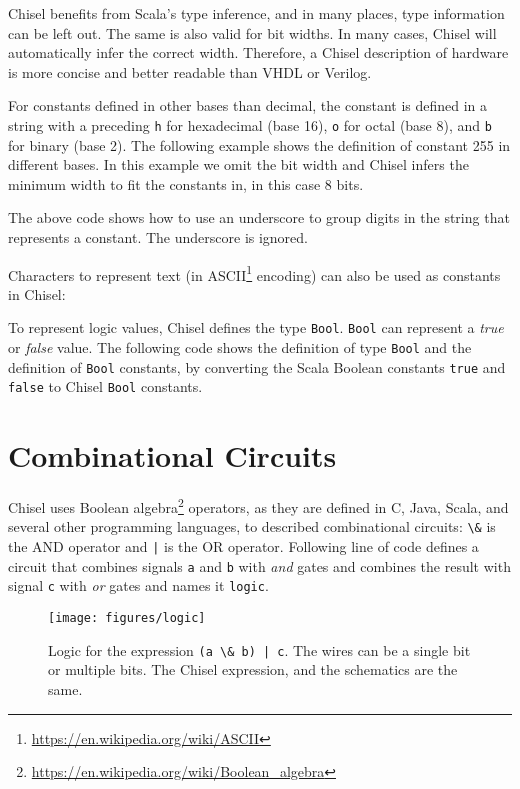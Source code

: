 \documentclass[%
    10pt,
    headinclude, footexclude,
    openright, %
    notitlepage,
    cleardoubleempty,
    headsepline,
    pointlessnumbers,
    bibtotoc, idxtotoc,
    ]{scrbook}
\newcommand{\scale}{0.7}
\newcommand{\code}[1]{{\lstinline[basicstyle=\small\ttfamily]{#1}}}
\newcommand{\myref}[2]{\href{#1}{#2}}
\renewcommand{\myref}[2]{{#2}{\footnote{\url{#1}}}}
\begin{document}
Chisel benefits from Scala's type inference, and in many places, type information can be left out.
The same is also valid for bit widths. In many cases, Chisel will automatically infer the correct width.
Therefore, a Chisel description of hardware is more concise and better readable than VHDL or
Verilog.

For constants defined in other bases than decimal, the constant is defined in a string with
a preceding \code{h} for hexadecimal (base 16), \code{o} for octal (base 8), and \code{b}
for binary (base 2). The following example shows the definition of constant 255 in different
bases. In this example we omit the bit width and Chisel infers the minimum width to fit
the constants in, in this case 8 bits.


\noindent The above code shows how to use an underscore to group digits in the
string that represents a constant. The underscore is ignored.

Characters to represent text (in \myref{https://en.wikipedia.org/wiki/ASCII}{ASCII} encoding)
can also be used as constants in Chisel:



To represent logic values, Chisel defines the type \code{Bool}.
\code{Bool} can represent a \emph{true} or \emph{false} value.
The following code shows the definition of type \code{Bool} and the definition of
\code{Bool} constants, by converting the Scala Boolean constants \code{true}
and \code{false} to Chisel \code{Bool} constants.



\section{Combinational Circuits}

Chisel uses \myref{https://en.wikipedia.org/wiki/Boolean_algebra}{Boolean algebra} operators,
as they are defined in C, Java, Scala, and several other programming languages,
to described combinational circuits: \code{\&} is the AND operator and \code{|} is
the OR operator.
Following line of code defines a circuit that combines signals \code{a} and \code{b} with \emph{and}
gates and combines the result with signal \code{c} with \emph{or} gates and names it \code{logic}.


\begin{figure}
  \centering
  \texttt{[image: figures/logic]}
  \caption{Logic for the expression \code{(a \& b) | c}.
  The wires can be a single bit or multiple bits. The Chisel expression, and the schematics are the same.}
  \label{fig:logic}
\end{figure}
\end{document}

